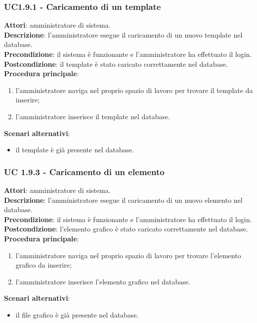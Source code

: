 \subsubsection{UC1.9.1 - Caricamento di un template}{
	\label{uc1.9.1}
	\textbf{Attori}: amministratore di sistema. \\
	\textbf{Descrizione}: l'amministratore esegue il caricamento di un nuovo template nel database. \\
	\textbf{Precondizione}: il sistema  è funzionante e l'amministratore ha effettuato il login.	\\
	\textbf{Postcondizione}: il template è stato caricato correttamente nel database.	\\
	\textbf{Procedura principale}:
	\begin{enumerate}
		\item l'amministratore naviga nel proprio spazio di lavoro  per trovare il template da inserire;
		\item l'amministratore inserisce il template nel database.
	\end{enumerate}
	\textbf{Scenari alternativi}:
	\begin{itemize}
		\item il template è già presente nel database.
	\end{itemize}
	}
\subsubsection{UC 1.9.3 - Caricamento di un elemento}{
	\label{uc1.9.3}
	\textbf{Attori}: amministratore di sistema. \\
	\textbf{Descrizione}: l'amministratore esegue il caricamento di un nuovo elemento nel database. \\
	\textbf{Precondizione}: il sistema  è funzionante e l'amministratore ha effettuato il login.	\\
	\textbf{Postcondizione}: l'elemento grafico è stato caricato correttamente nel database.	\\
	\textbf{Procedura principale}:
	\begin{enumerate}
		\item l'amministratore naviga nel proprio spazio di lavoro per trovare l'elemento grafico da inserire;
		\item l'amministratore inserisce l'elemento grafico nel database.
	\end{enumerate}
	\textbf{Scenari alternativi}:
	\begin{itemize}
		\item il file grafico è già presente nel database.
	\end{itemize}
	}
